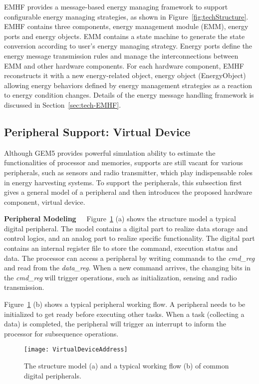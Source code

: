 %
EMHF provides a message-based energy managing framework to support configurable energy managing strategies, as shown in Figure~\ref{fig:techStructure}.
EMHF contains three components, energy management module (EMM), energy ports and energy objects. 
EMM contains a state machine to generate the state conversion according to user's energy managing strategy. 
Energy ports define the energy message transmission rules and manage the interconnections between EMM and other hardware components.
For each hardware component, EMHF reconstructs it with a new energy-related object, energy object (EnergyObject) allowing energy behaviors defined by energy management strategies as a reaction to energy condition changes.
Details of the energy message handling framework is discussed in Section~\ref{sec:tech-EMHF}.


\subsection{Peripheral Support: Virtual Device}	\label{sec:tech-vdev}
%
Although GEM5 provides powerful simulation ability to estimate the functionalities of processor and memories, supports are still vacant for various peripherals, such as sensors and radio transmitter, which play indispensable roles in energy harvesting systems.
To support the peripherals, this subsection first gives a general model of a peripheral and then introduces the proposed hardware component, virtual device.

\textbf{Peripheral Modeling\ \ }
%
Figure~\ref{fig:PeripheralModel} (a) shows the structure model a typical digital peripheral.
The model contains a digital part to realize data storage and control logics, and an analog part to realize specific functionality.
The digital part contains an internal register file to store the command, execution status and data.
The processor can access a peripheral by writing commands to the \emph{cmd\_reg} and read from the \emph{data\_reg}.
When a new command arrives, the changing bits in the \emph{cmd\_reg} will trigger operations, such as initialization, sensing and radio transmission.

Figure~\ref{fig:PeripheralModel} (b) shows a typical peripheral working flow.
A peripheral needs to be initialized to get ready before executing other tasks.
When a task (collecting a data) is completed, the peripheral will trigger an interrupt to inform the processor for subsequence operations.

\begin{figure}[!htpb]
	\centering
	\vspace{-5pt}
	\texttt{[image: VirtualDeviceAddress]}
	\vspace{-5pt}
	\caption{The structure model (a) and a typical working flow (b) of common digital peripherals.}	\label{fig:PeripheralModel}
\end{figure}

